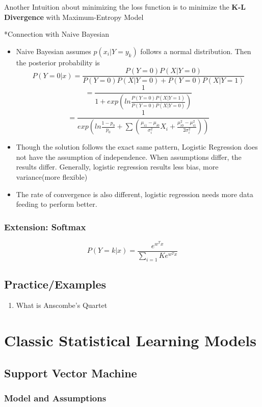 \documentclass[11pt, openany]{book}              %
\begin{document}
Another Intuition about minimizing the loss function is to minimize the \textbf{K-L Divergence} with Maximum-Entropy Model 

*Connection with Naive Bayesian

\begin{itemize}
    \item Naive Bayesian assumes $p(x_i|Y=y_k)$ follows a normal distribution. Then the posterior probability is
    $$ P(Y=0|x) = \frac{P(Y=0)P(X|Y=0)}{P(Y=0)P(X|Y=0) + P(Y=0)P(X|Y=1)} $$
    $$= \frac{1}{1+ exp(ln\frac{P(Y=0)P(X|Y=1)}{P(Y=0)P(X|Y=0)})} $$
    $$ = \frac{1}{exp(ln\frac{1-p_0}{p_0} + \sum(\frac{\mu_{i1}-\mu_{i0}}{\sigma_i^2}X_i + \frac{\mu_{i0}^2-\mu_{i1}^2}{2\sigma_i^2}))}$$
    \item Though the solution follows the exact same pattern, Logistic Regression does not have the assumption of independence. When assumptions differ, the results differ. Generally, logistic regression results less bias, more variance(more flexible)
    \item The rate of convergence is also different, logistic regression needs more data feeding to perform better.
\end{itemize}

\subsection{Extension: Softmax}

$$P(Y=k|x) = \frac{e^{w^Tx}}{\sum_{i=1}{K}e^{w^Tx}}$$

\section{Practice/Examples}

\begin{enumerate}
    \item What is Anscombe's Quartet 
\end{enumerate}

\chapter{Classic Statistical Learning Models}


\section{Support Vector Machine}

\subsection{Model and Assumptions}
\end{document}
